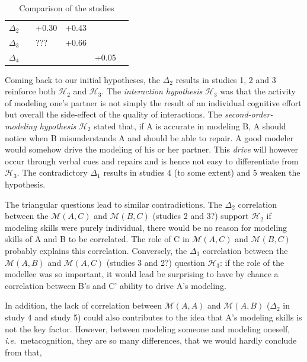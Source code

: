 \documentclass[twocolumn]{article}
\newcommand{\ie}{{\textit{i.e.\ }}}
\newcommand{\gmodel}[2]{{$\mathcal{M}(#1, #2)$}}
\begin{document}
\begin{table}[h!t]
{\begin{tabular}{p{3cm}|p{4cm}|p{4cm}|p{4cm}|p{4cm}|p{4cm}}
\textit{$\Delta_2$}                   &                                  & +0.30                           & +0.43                     &                           &                              \\
\textit{$\Delta_3$}                   &                                  & ???                             & +0.66                     &                           &                              \\
\textit{$\Delta_4$}                   &                                  &                                 &                           & +0.05                     &                             
\end{tabular}
}
\caption{Comparison of the studies}
\label{synthesis_table}
\end{table}

Coming back to our initial hypotheses, the $\Delta_2$ results in studies 1, 2
and 3 reinforce both $\mathcal{H}_{2}$ and $\mathcal{H}_{3}$. The
\emph{interaction hypothesis} $\mathcal{H}_{3}$ was that the activity of
modeling one's partner is not simply the result of an individual cognitive
effort but overall the side-effect of the quality of interactions. The
\emph{second-order-modeling hypothesis} $\mathcal{H}_{2}$ stated that, if A is
accurate in modeling B, A should notice when B misunderstands A and should be
able to repair. A good modeler would somehow drive the modeling of his or her
partner.  This \emph{drive} will however occur through verbal cues and repairs
and is hence not easy to differentiate from $\mathcal{H}_{3}$.  The
contradictory $\Delta_1$ results in studies 4 (to some extent) and 5 weaken the
hypothesis. 

The triangular questions lead to similar contradictions. The $\Delta_2$
correlation between the \gmodel{A}{C} and \gmodel{B}{C} (studies 2 and 3?)
support $\mathcal{H}_{2}$ if modeling skills were purely individual, there would
be no reason for modeling skills of A and B to be correlated.  The role of C in
\gmodel{A}{C} and \gmodel{B}{C} probably explains this correlation.  Conversely,
the $\Delta_3$ correlation between the \gmodel{A}{B} and \gmodel{A}{C} (studies
3 and 2?) question $\mathcal{H}_{3}$: if the role of the modellee was so
important, it would lead be surprising to have by chance a correlation between
B's and C' ability to drive A's modeling.

In addition, the lack of correlation between \gmodel{A}{A} and \gmodel{A}{B}
($\Delta_2$ in study 4 and study 5) could also contributes to the idea that A's
modeling skills is not the key factor. However, between modeling someone and
modeling oneself, \ie  metacognition, they are so many differences, that we
would hardly conclude from that,
\end{document}
